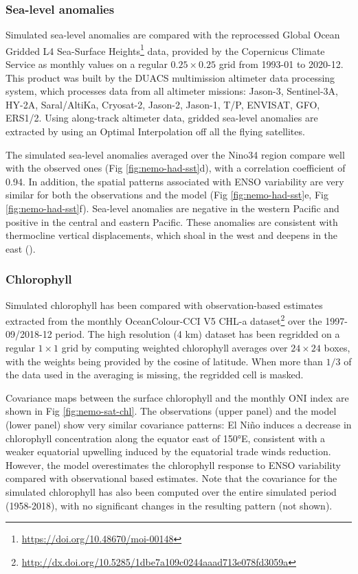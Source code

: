 \subsubsection{Sea-level anomalies}

Simulated sea-level anomalies are compared with the reprocessed Global Ocean Gridded L4 Sea-Surface Heights\footnote{\url{https://doi.org/10.48670/moi-00148}} data, provided by the Copernicus Climate Service as monthly values on a regular $0.25 \times 0.25$ grid from 1993-01 to 2020-12. This product was built by the DUACS multimission altimeter data processing system, which processes data from all altimeter missions: Jason-3, Sentinel-3A, HY-2A, Saral/AltiKa, Cryosat-2, Jason-2, Jason-1, T/P, ENVISAT, GFO, ERS1/2. Using along-track altimeter data, gridded sea-level anomalies are extracted by using an Optimal Interpolation off all the flying satellites. 

The simulated sea-level anomalies averaged over the Nino34 region compare well with the observed ones (Fig \ref{fig:nemo-had-sst}d), with a correlation coefficient of 0.94. In addition, the spatial patterns associated with ENSO variability are very similar for both the observations and the model (Fig \ref{fig:nemo-had-sst}e, Fig \ref{fig:nemo-had-sst}f). Sea-level anomalies are negative in the western Pacific and positive in the central and eastern Pacific. These anomalies are consistent with thermocline vertical displacements, which shoal in the west and deepens in the east ().

\subsubsection{Chlorophyll}

Simulated chlorophyll has been compared with observation-based estimates extracted from the monthly OceanColour-CCI V5 CHL-a dataset\footnote{\url{http://dx.doi.org/10.5285/1dbe7a109c0244aaad713e078fd3059a}} \citep{sathyendranathOceanColourTimeSeries2019} over the 1997-09/2018-12 period. The high resolution (4 km)  dataset has been regridded on a regular $1\times 1$ grid by computing weighted chlorophyll averages over $24\times24$ boxes, with the weights being provided by the cosine of latitude. When more than $1/3$ of the data used in the averaging is missing, the regridded cell is masked.

Covariance maps between the surface chlorophyll and the monthly ONI index are shown in Fig \ref{fig:nemo-sat-chl}. The observations (upper panel) and the model (lower panel) show very similar covariance patterns: El Niño induces a decrease in chlorophyll concentration along the equator east of 150°E, consistent with a weaker equatorial upwelling induced by the equatorial trade winds reduction. However, the model overestimates the chlorophyll response to ENSO variability compared with observational based estimates. Note that the covariance for the simulated chlorophyll has also been computed over the entire simulated period (1958-2018), with no significant changes in the resulting pattern (not shown).

